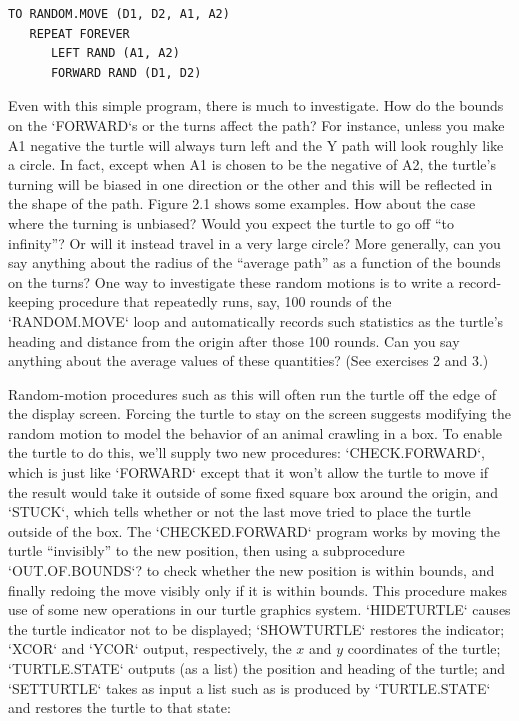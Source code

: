 \documentclass{book}
\begin{document}
\begin{verbatim}
TO RANDOM.MOVE (D1, D2, A1, A2)
   REPEAT FOREVER
      LEFT RAND (A1, A2)
      FORWARD RAND (D1, D2)
\end{verbatim}
Even with this simple program, there is much to investigate. How do
the bounds on the \textsc{`FORWARD`}s or the turns affect the path? For instance,
unless you make A1 negative the turtle will always turn left and the Y
path will look roughly like a circle. In fact, except when A1 is chosen to
be the negative of A2, the turtle's turning will be biased in one direction 
or the other and this will be reflected in the shape of the path. Figure
2.1 shows some examples. How about the case where the turning is 
unbiased? Would you expect the turtle to go off ``to infinity''? Or will 
it instead travel in a very large circle? More generally, can you say
anything about the radius of the ``average path'' as a function of the 
bounds on the turns? One way to investigate these random motions is to
write a record-keeping procedure that repeatedly runs, say, 100 rounds
of the \textsc{`RANDOM.MOVE`} loop and automatically records such statistics as
the turtle's heading and distance from the origin after those 100 rounds.
Can you say anything about the average values of these quantities? (See
exercises 2 and 3.)

Random-motion procedures such as this will often run the turtle off
the edge of the display screen. Forcing the turtle to stay on the screen
suggests modifying the random motion to model the behavior of an
animal crawling in a box. To enable the turtle to do this, we'll supply
two new procedures: \textsc{`CHECK.FORWARD`}, which is just like \textsc{`FORWARD`} except
that it won't allow the turtle to move if the result would take it outside of
some fixed square box around the origin, and \textsc{`STUCK`}, which tells whether
or not the last move tried to place the turtle outside of the box.
The \textsc{`CHECKED.FORWARD`} program works by moving the turtle ``invisibly''
to the new position, then using a subprocedure \textsc{`OUT.OF.BOUNDS`}? to check
whether the new position is within bounds, and finally redoing the move
visibly only if it is within bounds. This procedure makes use of some
new operations in our turtle graphics system. \textsc{`HIDETURTLE`} causes the
turtle indicator not to be displayed; \textsc{`SHOWTURTLE`} restores the indicator;
\textsc{`XCOR`} and \textsc{`YCOR`} output, respectively, the $x$ and $y$ coordinates of the
turtle; \textsc{`TURTLE.STATE`} outputs (as a list) the position and heading of
the turtle; and \textsc{`SETTURTLE`} takes as input a list such as is produced by
\textsc{`TURTLE.STATE`} and restores the turtle to that state:
\end{document}
